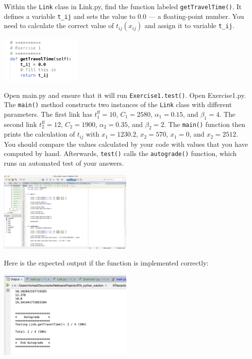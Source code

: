 \documentclass[11pt]{article}
\begin{document}
Within the \texttt{Link} class in Link.py, find the function labeled \texttt{getTravelTime()}. It defines a variable \texttt{t\_{ij}} and sets the value to 0.0 --- a floating-point number. You need to calculate the correct value of $t_{ij}(x_{ij})$ and assign it to variable \texttt{t\_ij}. 
	
	\begin{center}
		\includegraphics[width=0.3\textwidth]{netbeans3.png}
	\end{center}

\noindent Open main.py and ensure that it will run \texttt{Exercise1.test()}.
Open Exercise1.py. The \texttt{main()} method constructs two instances of the \texttt{Link} class with different parameters. The first link has $t^{\mathrm{ff}}_{1}=10$, $C_{1}=2580$, $\alpha_{1}=0.15$, and $\beta_{1}=4$. The second link $t^{\mathrm{ff}}_{2}=12$, $C_{2}=1900$, $\alpha_{2}=0.35$, and $\beta_{2}=2$. The \texttt{main()} function then prints the calculation of $t_{ij}$ with $x_{1}=1230.2$, $x_2=570$, $x_1=0$, and $x_2=2512$. You should compare the values calculated by your code with values that you have computed by hand. 
Afterwards, \texttt{test()} calls the \texttt{autograde()} function, which runs an automated test of your answers. 
	
	
	\begin{center}
	\includegraphics[width=0.5\textwidth]{netbeans4.png}
\end{center}
	
Here is the expected output if the function is implemented correctly:


	\begin{center}
	\includegraphics[width=0.5\textwidth]{netbeans5.png}
\end{center}	
	
\end{document}
